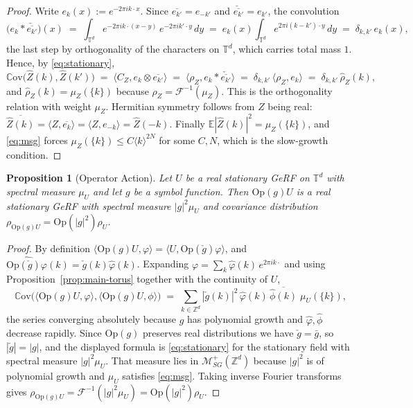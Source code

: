 \documentclass[pdflatex,sn-mathphys,Numbered]{sn-jnl}
\theoremstyle{thmstyleone}%
\newtheorem{proposition}[theorem]{Proposition}%
\theoremstyle{thmstyletwo}%
\theoremstyle{thmstylethree}%
\newcommand{\ZZ}{\mathbb{Z}}
\newcommand{\TT}{\mathbb{T}}
\newcommand{\calM}{\mathcal{M}}
\newcommand{\F}{\mathscr{F}}
\newcommand{\Op}{\mathrm{Op}}
\newcommand{\Cov}{\mathbb{C}\mathrm{ov}}
\newcommand{\E}{\mathbb{E}}
\begin{document}
\begin{appendices}
\begin{proof}
Write $e_k(x) := e^{-2\pi i k\cdot x}$. Since $\overline{e_{k'}} = e_{-k'}$ and
$\check{\overline{e_{k'}}} = e_{k'}$, the convolution
\[
    \bigl(e_k \ast \check{\overline{e_{k'}}}\bigr)(x)
    \;=\; \int_{\TT^d} e^{-2\pi i k\cdot(x-y)}\,e^{-2\pi i k'\cdot y}\,dy
    \;=\; e_k(x)\int_{\TT^d} e^{2\pi i (k-k')\cdot y}\,dy
    \;=\; \delta_{k,k'}\,e_k(x) ,
\]
the last step by orthogonality of the characters on $\TT^d$, which carries total
mass $1$. Hence, by \eqref{eq:stationary},
\[
    \Cov\bigl(\hat Z(k),\hat Z(k')\bigr)
    \;=\; \bigl\langle C_Z, e_k \otimes \overline{e_{k'}}\bigr\rangle
    \;=\; \bigl\langle \rho_Z, e_k \ast \check{\overline{e_{k'}}}\bigr\rangle
    \;=\; \delta_{k,k'}\,\langle \rho_Z, e_k\rangle
    \;=\; \delta_{k,k'}\,\hat\rho_Z(k) ,
\]
and $\hat\rho_Z(k) = \mu_Z(\{k\})$ because $\rho_Z = \F^{-1}(\mu_Z)$. This is the
orthogonality relation with weight $\mu_Z$. Hermitian symmetry follows from $Z$
being real: $\overline{\hat Z(k)} = \langle Z, \overline{e_k}\rangle
= \langle Z, e_{-k}\rangle = \hat Z(-k)$. Finally
$\E|\hat Z(k)|^2 = \mu_Z(\{k\})$, and \eqref{eq:msg} forces
$\mu_Z(\{k\}) \leq C\langle k\rangle^{2N}$ for some $C,N$, which is the
slow-growth condition.
\end{proof}

\begin{proposition}[Operator Action]\label{prop:main}
Let $U$ be a real stationary GeRF on $\TT^d$ with spectral measure $\mu_U$ and let $g$ be a symbol function. Then $\Op(g) U$ is a real stationary GeRF with spectral measure $|g|^2 \mu_U$ and covariance distribution $\rho_{\Op(g) U} = \Op(|g|^2)\rho_U$.
\end{proposition}

\begin{proof}
By definition $\langle \Op(g)U,\varphi\rangle = \langle U, \Op(\check g)\varphi\rangle$,
and $\widehat{\Op(\check g)\varphi}(k) = \check g(k)\hat\varphi(k)$. Expanding
$\varphi = \sum_k \hat\varphi(k)\,e^{2\pi i k\cdot}$ and using
Proposition~\ref{prop:main-torus} together with the continuity of $U$,
\[
    \Cov\bigl(\langle \Op(g)U,\varphi\rangle,\langle \Op(g)U,\phi\rangle\bigr)
    \;=\; \sum_{k\in\ZZ^d} |\check g(k)|^2\,\hat\varphi(k)\,
          \overline{\hat\phi(k)}\;\mu_U(\{k\}) ,
\]
the series converging absolutely because $g$ has polynomial growth and
$\hat\varphi,\hat\phi$ decrease rapidly. Since $\Op(g)$ preserves real
distributions we have $\check g = \bar g$, so $|\check g| = |g|$, and the
displayed formula is \eqref{eq:stationary} for the stationary field with
spectral measure $|g|^2\mu_U$. That measure lies in $\calM^+_{SG}(\ZZ^d)$
because $|g|^2$ is of polynomial growth and $\mu_U$ satisfies \eqref{eq:msg}.
Taking inverse Fourier transforms gives
$\rho_{\Op(g)U} = \F^{-1}(|g|^2\mu_U) = \Op(|g|^2)\rho_U$.
\end{proof}


\end{appendices}
\end{document}
